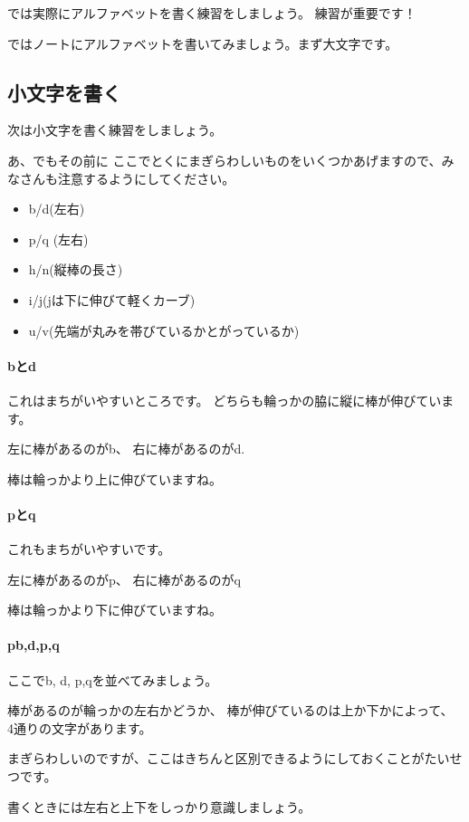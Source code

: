 \documentclass[book,jafontscale=0.9247]{jlreq}
\begin{document}
では実際にアルファベットを書く練習をしましょう。
練習が重要です！


ではノートにアルファベットを書いてみましょう。まず大文字です。

\subsection{小文字を書く}

次は小文字を書く練習をしましょう。

あ、でもその前に
ここでとくにまぎらわしいものをいくつかあげますので、みなさんも注意するようにしてください。

\begin{itemize}
 \item  b/d(左右)
 \item  p/q (左右)
 \item h/n(縦棒の長さ)
 \item i/j(jは下に伸びて軽くカーブ)
 \item u/v(先端が丸みを帯びているかとがっているか)
\end{itemize}


\paragraph{bとd}

これはまちがいやすいところです。
どちらも輪っかの脇に縦に棒が伸びています。

左に棒があるのがb、
右に棒があるのがd.

棒は輪っかより上に伸びていますね。

\paragraph{pとq}
これもまちがいやすいです。


左に棒があるのがp、
右に棒があるのがq

棒は輪っかより下に伸びていますね。
\paragraph{pb,d,p,q}

ここでb, d, p,qを並べてみましょう。

棒があるのが輪っかの左右かどうか、
棒が伸びているのは上か下かによって、
4通りの文字があります。

まぎらわしいのですが、ここはきちんと区別できるようにしておくことがたいせつです。

書くときには左右と上下をしっかり意識しましょう。
\end{document}

